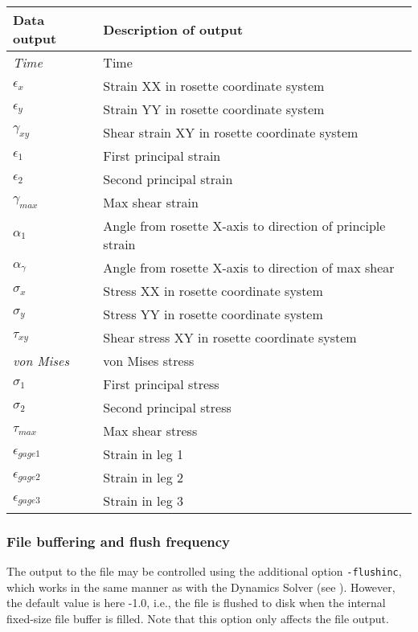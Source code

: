 \begin{tabular}{| m{19mm} | m{85mm} |}
  \hline
  Data output    &  Description of output \\
  \hline\hline
  {\sl Time}     & Time \\
  $\epsilon_x$   & Strain XX in rosette coordinate system \\
  $\epsilon_y$   & Strain YY in rosette coordinate system \\
  $\gamma_{xy}$   & Shear strain XY in rosette coordinate system \\
  $\epsilon_1$   & First principal strain \\
  $\epsilon_2$   & Second principal strain \\
  $\gamma_{max}$  & Max shear strain \\
  $\alpha_1$     & Angle from rosette X-axis to direction of principle strain \\
  $\alpha_\gamma$ & Angle from rosette X-axis to direction of max shear \\
  $\sigma_x$     & Stress XX in rosette coordinate system \\
  $\sigma_y$     & Stress YY in rosette coordinate system \\
  $\tau_{xy}$     & Shear stress XY in rosette coordinate system \\
  {\sl von Mises} & von Mises stress \\
  $\sigma_1$      & First principal stress \\
  $\sigma_2$      & Second principal stress \\
  $\tau_{max}$     & Max shear stress \\
  $\epsilon_{gage1}$ & Strain in leg 1 \\
  $\epsilon_{gage2}$ & Strain in leg 2 \\
  $\epsilon_{gage3}$ & Strain in leg 3 \\
  \hline
\end{tabular}

\subsubsection{File buffering and flush frequency}

The output to the  file may be controlled using the additional option
{\tt-flushinc}, which works in the same manner as with the Dynamics Solver
(see ).
However, the default value is here -1.0, i.e., the file is flushed to disk
when the internal fixed-size file buffer is filled.
Note that this option only affects the  file output.

